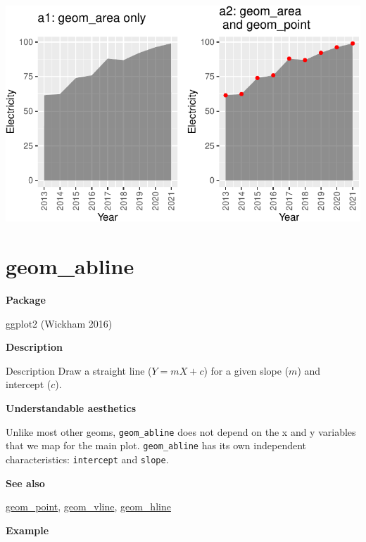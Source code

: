 \documentclass[
  letterpaper,
  DIV=11,
  numbers=noendperiod]{scrreprt}
\begin{document}
\includegraphics{a_files/figure-pdf/area-1.pdf}

\section{geom\_abline}\label{abline}

\textbf{Package}

ggplot2 (Wickham 2016)

\textbf{Description}

Description Draw a straight line (\(Y=mX+c\)) for a given slope (\(m\))
and intercept (\(c\)).

\textbf{Understandable aesthetics}

Unlike most other geoms, \texttt{geom\_abline} does not depend on the x
and y variables that we map for the main plot. \texttt{geom\_abline} has
its own independent characteristics: \texttt{intercept} and
\texttt{slope}.

\textbf{See also}

\hyperref[point]{geom\_point}, \hyperref[vline]{geom\_vline},
\hyperref[hline]{geom\_hline}

\textbf{Example}
\end{document}
